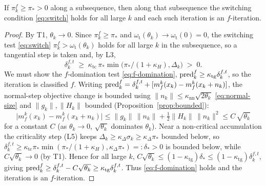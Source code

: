 \begin{lemma}
  \label{lem:eventually-f}
  If $\pi_k^f\ge\pi_*>0$ along a subsequence, then along that subsequence the
  switching condition \eqref{eq:switch} holds for all large $k$ and each such
  iteration is an $f$-iteration.
\end{lemma}
\begin{proof}
  By T1, $\theta_k\to0$. Since $\pi_k^f\ge\pi_*$ and $\omega_{\mathrm t}(\theta_k)\to
  \omega_{\mathrm t}(0)=0$, the switching test \eqref{eq:switch}
  $\pi_k^f>\omega_{\mathrm t}(\theta_k)$ holds for all large $k$ in the subsequence, so
  a tangential step is taken and, by L3,
  \[
    \delta^{f,t}_k \;\ge\; \kappa_{\mathrm{tc}}\,\pi_*\min\!\bigl(\pi_*/(1+\kappa_H),\Delta_k\bigr)\;>\;0.
  \]
  We must show the $f$-domination test \eqref{eq:f-domination},
  $\operatorname{pred}^f_k\ge\kappa_{\mathrm{tg}}\delta^{f,t}_k$, so the iteration is classified $f$.
  Writing $\operatorname{pred}^f_k=\delta^{f,t}_k+[m_f^k(x_k)-m_f^k(x_k+n_k)]$, the normal-step
  objective change is bounded using $\|n_k\|\le\kappa_{\mathrm{nn}}\sqrt{2\theta_k}$
  \eqref{eq:normal-size} and $\|g_k\|,\|H_k\|$ bounded (Proposition~\ref{prop:bounded}):
  \[
    \bigl|m_f^k(x_k)-m_f^k(x_k+n_k)\bigr|
      \le \|g_k\|\,\|n_k\| + \tfrac12\|H_k\|\,\|n_k\|^2
      \le C\,\sqrt{\theta_k}
  \]
  for a constant $C$ (as $\theta_k\to0$, $\sqrt{\theta_k}$ dominates $\theta_k$). Near a
  non-critical accumulation the criticality step (L5) keeps
  $\Delta_k\ge\kappa_\Delta\sigma_k\ge\kappa_\Delta\pi_*$ bounded below, so
  $\delta^{f,t}_k\ge\kappa_{\mathrm{tc}}\pi_*\min(\pi_*/(1+\kappa_H),\kappa_\Delta\pi_*)=:\delta_*>0$
  is bounded below, while $C\sqrt{\theta_k}\to0$ (by T1). Hence for all large $k$,
  $C\sqrt{\theta_k}\le(1-\kappa_{\mathrm{tg}})\delta_*\le(1-\kappa_{\mathrm{tg}})\delta^{f,t}_k$,
  giving $\operatorname{pred}^f_k\ge\delta^{f,t}_k-C\sqrt{\theta_k}\ge\kappa_{\mathrm{tg}}\delta^{f,t}_k$.
  Thus \eqref{eq:f-domination} holds and the iteration is an $f$-iteration.
\end{proof}

